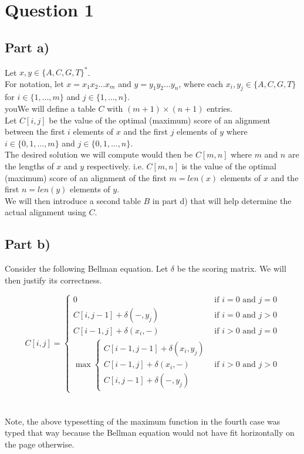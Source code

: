 \documentclass[12pt]{article}
\begin{document}
\setlength\parindent{0pt}

\section*{Question 1}

\subsection*{Part a)}

Let $x,y \in \{A, C, G, T\}^*$. \\

For notation, let $x = x_1x_2...x_m$ and $y = y_1y_2...y_n$, where each $x_i, y_j \in \{A, C, G, T\}$ for $i \in \{1,...,m\}$ and $j \in \{1,...,n\}$. \\

youWe will define a table $C$ with $(m + 1) \times (n + 1)$ entries. \\

Let $C[i,j]$ be the value of the optimal (maximum) score of an alignment between the first $i$ elements of $x$ and the first $j$ elements of $y$ where $i \in \{0,1,...,m\}$ and $j \in \{0,1,...,n\}$. \\

The desired solution we will compute would then be $C[m,n]$ where $m$ and $n$ are the lengths of $x$ and $y$ respectively. i.e. $C[m,n]$ is the value of the optimal (maximum) score of an alignment of the first $m = len(x)$ elements of $x$ and the first $n = len(y)$ elements of $y$. \\

We will then introduce a second table $B$ in part d) that will help determine the actual alignment using $C$. 

\subsection*{Part b)}

Consider the following Bellman equation. Let $\delta$ be the scoring matrix. We will then justify its correctness. 

\[
  C[i,j] =
  \begin{cases}
        0 & \text{if $i = 0$ and $j = 0$} \\
        C[i, j-1] + \delta(-,y_j) & \text{if $i = 0$ and $j > 0$} \\
        C[i-1, j] + \delta(x_i,-) & \text{if $i > 0$ and $j = 0$} \\
        \max\begin{cases} 
            C[i-1,j-1] + \delta(x_i,y_j) \\
            C[i-1,j] + \delta(x_i,-) \\
            C[i,j-1] + \delta(-,y_j)
        \end{cases}
        &\text{if $i > 0$ and $j > 0$} 
  \end{cases}
\]
\\
\\
Note, the above typesetting of the maximum function in the fourth case was typed that way because the Bellman equation would not have fit horizontally on the page otherwise. \\
\end{document}
